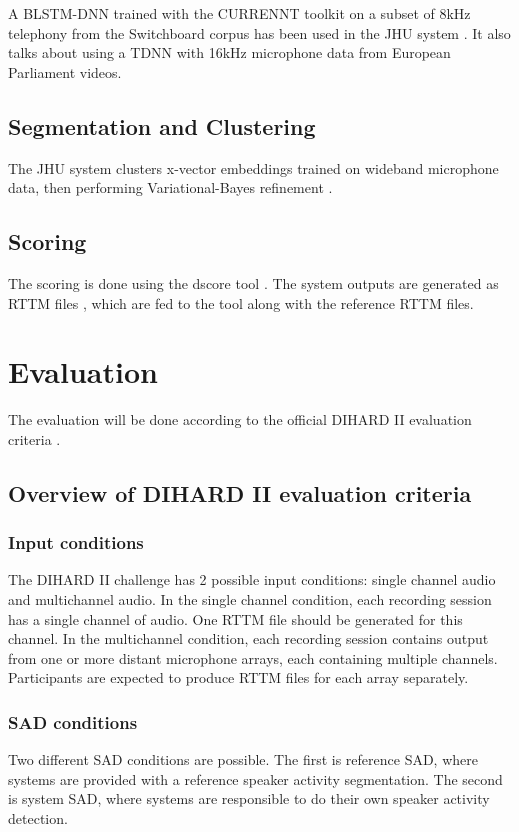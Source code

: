 	A BLSTM-DNN trained with the CURRENNT toolkit \cite{JMLR:v16:weninger15a} on a subset of 8kHz telephony from the Switchboard corpus \cite{godfrey1992switchboard} has been used in the JHU system \cite{sell2018diarization}. It also talks about using a TDNN \cite{21701} \cite{peddinti2015time} with 16kHz microphone data from European Parliament videos.
	
	\subsection{Segmentation and Clustering}
	The JHU system \cite{sell2018diarization} clusters x-vector embeddings \cite{garcia2017speaker} trained on wideband microphone data, then performing Variational-Bayes refinement \cite{sell2015diarization}.
			
	\subsection{Scoring}
	The scoring is done using the dscore tool \cite{dscore}. The system outputs are generated as RTTM files \cite{ryant2018first}, which are fed to the tool along with the reference RTTM files.

\section{Evaluation}
	The evaluation will be done according to the official DIHARD II evaluation criteria \cite{ryant2019second}.
	
	\subsection{Overview of DIHARD II evaluation criteria}
	\subsubsection{Input conditions}
		The DIHARD II challenge has 2 possible input conditions: single channel audio and multichannel audio. In the single channel condition, each recording session has a single channel of audio. One RTTM file should be generated for this channel. In the multichannel condition, each recording session contains output from one or more distant microphone arrays, each containing multiple channels. Participants are expected to produce  RTTM files for each array separately.
		
	\subsubsection{SAD conditions}
	Two different SAD conditions are possible. The first is reference SAD, where systems are provided with a reference speaker activity segmentation. The second is system SAD, where systems are responsible to do their own speaker activity detection.
	
